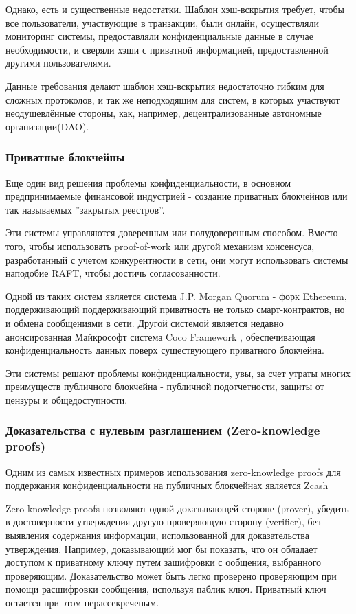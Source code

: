\documentclass[11pt]{article}
\begin{document}
 Однако, есть и существенные недостатки. Шаблон хэш-вскрытия требует, 
 чтобы все пользователи, участвующие в транзакции, были онлайн, 
 осуществляли мониторинг системы, предоставляли конфиденциальные 
 данные в случае необходимости, и сверяли хэши с приватной информацией, 
 предоставленной другими пользователями.

Данные требования делают шаблон хэш-вскрытия недостаточно гибким для 
сложных протоколов, и так же неподходящим для систем, в которых 
участвуют неодушевлённые  стороны, как, например, децентрализованные 
автономные организации(DAO).

\subsubsection{Приватные блокчейны}

Еще один вид решения проблемы конфиденциальности, в основном 
предпринимаемые финансовой индустрией - создание приватных блокчейнов 
или так называемых ”закрытых реестров”.

Эти системы управляются доверенным или полудоверенным способом. Вместо 
того, чтобы использовать proof-of-work или другой механизм консенсуса, 
разработанный с учетом конкурентности в сети, они могут использовать 
системы наподобие RAFT, чтобы достичь согласованности.

Одной из таких систем является система J.P. Morgan Quorum \cite{quorum}- 
форк Ethereum, поддерживающий поддерживающий приватность не только 
смарт-контрактов, но и обмена сообщениями в сети. Другой системой 
является недавно анонсированная Майкрософт система Coco Framework \cite{coco}, 
обеспечивающая конфиденциальность данных поверх существующего 
приватного блокчейна.

Эти системы решают проблемы конфиденциальности, увы, за счет утраты 
многих преимуществ публичного блокчейна - публичной подотчетности, 
защиты от цензуры и общедоступности. 

\subsubsection{Доказательства с нулевым разглашением (Zero-knowledge proofs)}

Одним из самых известных примеров использования zero-knowledge proofs 
для поддержания конфиденциальности на публичных блокчейнах является Zcash \cite{zcash} 

Zero-knowledge proofs позволяют одной доказывающей стороне (рrover), 
убедить в достоверности утверждения другую проверяющую сторону 
(verifier), без выявления содержания информации, использованной для 
доказательства утверждения. Например, доказывающий мог бы показать,
что он обладает доступом к приватному ключу путем зашифровки с
ообщения, выбранного проверяющим. Доказательство может быть легко 
проверено проверяющим при помощи расшифровки сообщения, используя 
паблик ключ. Приватный ключ остается при этом нерассекреченым.
\end{document}

